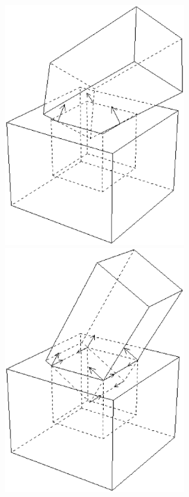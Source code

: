 \begin{figure}[h]
\includegraphics[width=7.9cm]{fig/fig-peg-in-hole1.ps}
\includegraphics[width=7.9cm]{fig/fig-peg-in-hole2.ps}

\end{figure}
